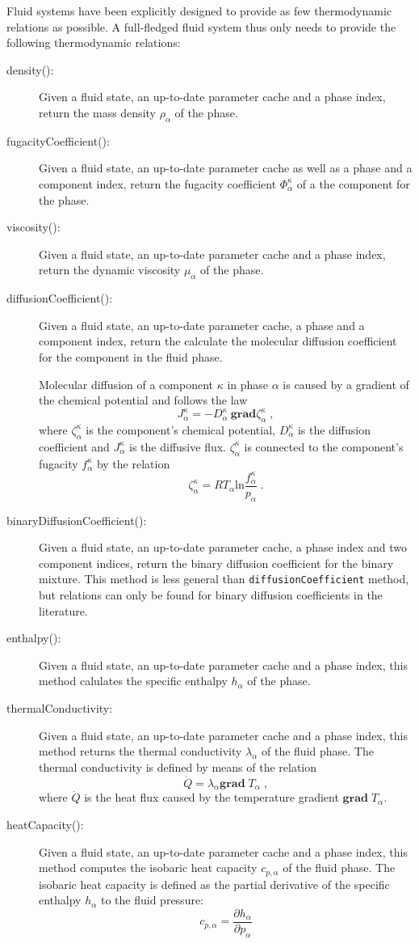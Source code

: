 Fluid systems have been explicitly designed to provide as few
thermodynamic relations as possible. A full-fledged fluid system thus
only needs to provide the following thermodynamic relations:
\begin{description}
\item[density():] Given a fluid state, an up-to-date parameter cache
  and a phase index, return the mass density $\rho_\alpha$ of the
  phase.
\item[fugacityCoefficient():] Given a fluid state, an up-to-date
  parameter cache as well as a phase and a component index, return the
  fugacity coefficient $\Phi^\kappa_\alpha$ of a the component for the
  phase.
\item[viscosity():] Given a fluid state, an up-to-date parameter cache
  and a phase index, return the dynamic viscosity $\mu_\alpha$ of the
  phase.
\item[diffusionCoefficient():] Given a fluid state, an up-to-date
  parameter cache, a phase and a component index, return the calculate
  the molecular diffusion coefficient for the component in the fluid
  phase.
  
  Molecular diffusion of a component $\kappa$ in phase $\alpha$ is
  caused by a gradient of the chemical potential and follows the law
  \[ 
  J^\kappa_\alpha = - D^\kappa_\alpha\ \mathbf{grad} \zeta^\kappa_\alpha\;,
  \] 
  where $\zeta^\kappa_\alpha$ is the component's chemical potential,
  $D^\kappa_\alpha$ is the diffusion coefficient and $J^\kappa_\alpha$
  is the diffusive flux. $\zeta^\kappa_\alpha$ is connected to the
  component's fugacity $f^\kappa_\alpha$ by the relation
  \[ 
  \zeta^\kappa_\alpha = 
  R T_\alpha \mathrm{ln} \frac{f^\kappa_\alpha}{p_\alpha} \;.
  \]
\item[binaryDiffusionCoefficient():] Given a fluid state, an
  up-to-date parameter cache, a phase index and two component indices,
  return the binary diffusion coefficient for the binary mixture. This
  method is less general than \texttt{diffusionCoefficient} method,
  but relations can only be found for binary diffusion coefficients in
  the literature.
\item[enthalpy():] Given a fluid state, an up-to-date parameter cache
  and a phase index, this method calulates the specific enthalpy
  $h_\alpha$ of the phase.
\item[thermalConductivity:] Given a fluid state, an up-to-date
  parameter cache and a phase index, this method returns the thermal
  conductivity $\lambda_\alpha$ of the fluid phase. The thermal
  conductivity is defined by means of the relation
  \[
  \dot Q = \lambda_\alpha \mathbf{grad}\;T_\alpha \;,
  \]
  where $\dot Q$ is the heat flux caused by the temperature gradient
  $\mathbf{grad}\;T_\alpha$.
\item[heatCapacity():] Given a fluid state, an up-to-date parameter
  cache and a phase index, this method computes the isobaric heat
  capacity $c_{p,\alpha}$ of the fluid phase. The isobaric heat
  capacity is defined as the partial derivative of the specific
  enthalpy $h_\alpha$ to the fluid pressure:
  \[
  c_{p,\alpha} = \frac{\partial h_\alpha}{\partial p_\alpha}
  \]
\end{description}


